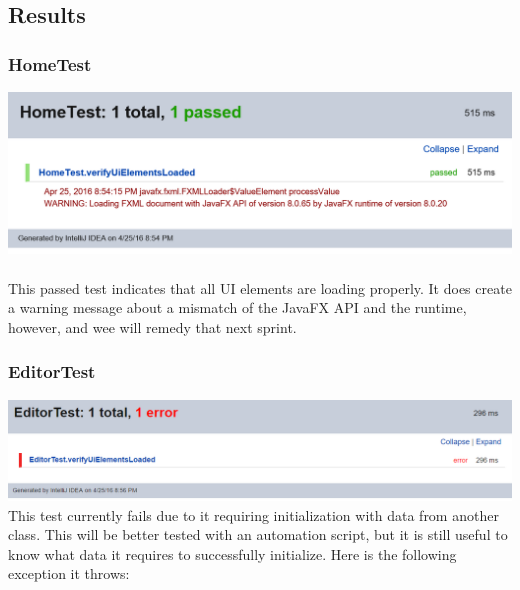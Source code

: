\documentclass[14pt, a4paper]{article}
\begin{document}
\newpage
\subsection{Results}

\subsubsection{HomeTest}

\includegraphics[width=\textwidth]{HomeTest} \\ \\

This passed test indicates that all UI elements are loading properly. It does create a warning message about a mismatch of the JavaFX API and the runtime, however, and wee will remedy that next sprint.

\newpage
\subsubsection{EditorTest}

\noindent\includegraphics[width=\textwidth]{EditorTest} \\

This test currently fails due to it requiring initialization with data from another class. This will be better tested with an automation script, but it is still useful to know what data it requires to successfully initialize. Here is the following exception it throws:
\end{document}
